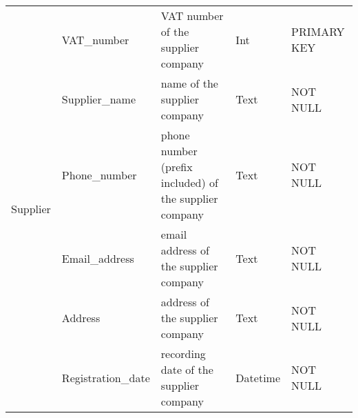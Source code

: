 \begin{longtable}{|p{}|p{} |p{}|p{}|p{} |}
\multirow{6}{*}{Supplier} & VAT\_number & VAT number of the supplier company & Int & PRIMARY KEY\\\cline{2-5}
& Supplier\_name & name of the supplier company & Text & NOT NULL \\\cline{2-5}
& Phone\_number & phone number (prefix included) of the supplier company  & Text & NOT NULL \\\cline{2-5} 
& Email\_address & email address of the supplier company & Text & NOT NULL \\\cline{2-5} 
& Address & address of the supplier company & Text & NOT NULL \\\cline{2-5} 
& Registration\_date & recording date of the supplier company & Datetime & NOT NULL \\\hline

\end{longtable}